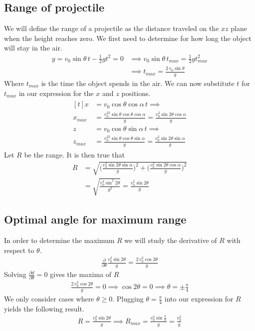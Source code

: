 \documentclass[%
aip,
jmp,
amsmath,amssymb,
reprint,%
]{revtex4-1}
\begin{document}
	\subsection{Range of projectile}
	We will define the range of a projectile as the distance traveled on the $xz$ plane when the height reaches zero. We first need to determine for how long the object will stay in the air.
	\begin{align}\nonumber
		y = v_0 \sin\theta\,t - \frac12gt^2 = 0&\implies v_0 \sin\theta\,t_{max} = \frac12gt_{max}^2\\\label{eq:tMax}
		&\implies t_{max} = \frac{2\,v_0 \sin\theta}{g}
	\end{align}
	Where $t_{max}$ is the time the object spends in the air. We can now substitute $t$ for $t_{max}$ in our expression for the $x$ and $z$ positions.
	\begin{align}\nonumber
		\begin{aligned}[t]
			x &= v_0 \cos\theta\cos\alpha\,t \implies  \\\nonumber
			x_{max} &= \frac{v_0^22\sin\theta\cos\theta\cos\alpha}{g} = \frac{v_0^2 \sin2\theta\cos\alpha}{g}\\\nonumber
			z &= v_0 \cos\theta\sin\alpha\,t \implies\\\nonumber
			z_{max} &= \frac{v_0^22\sin\theta\cos\theta\sin\alpha}{g} = \frac{v_0^2 \sin2\theta\sin\alpha}{g}\nonumber
		\end{aligned}
	\end{align}
	Let $R$ be the range. It is then true that
	\begin{align}\nonumber
		R &= \sqrt{\Big(\frac{v_{0}^2\sin2\theta\sin\alpha}{g}\Big)^2 + \Big(\frac{v_{0}^2\sin2\theta\cos\alpha}{g}\Big)^2}\\\label{eq:distance}
		&=\sqrt{\frac{v_{0}^4\sin^2 2\theta}{g^2}} = \frac{v_{0}^2\sin2\theta}{g}
	\end{align}
	\subsection{Optimal angle for maximum range}
	In order to determine the maximum $R$ we will study the derivative of $R$ with respect to $\theta$.
	\begin{align}\nonumber
		\frac{\partial}{\partial\theta} \frac{v_0^2\sin2\theta}{g} = \frac{2\,v_0^2\cos2\theta}{g}
	\end{align}
	Solving $\frac{\partial d}{\partial \theta} = 0$ gives the maxima of $R$
	\begin{align}\nonumber
		\frac{2\,v_0^2\cos2\theta}{g} = 0 \implies \cos2\theta = 0 \implies \theta = \pm\frac{\pi}{4}
	\end{align}
	We only consider cases where $\theta \geq 0$. Plugging $\theta=\frac{\pi}{4}$ into our expression for $R$ yields the following result.
	\begin{align}\nonumber
		R = \frac{v_{0}^2\sin2\theta}{g} \implies R_{max} = \frac{v_{0}^2\sin\frac\pi2}{g} = \frac{v_{0}^2}{g}
	\end{align}
\end{document}
